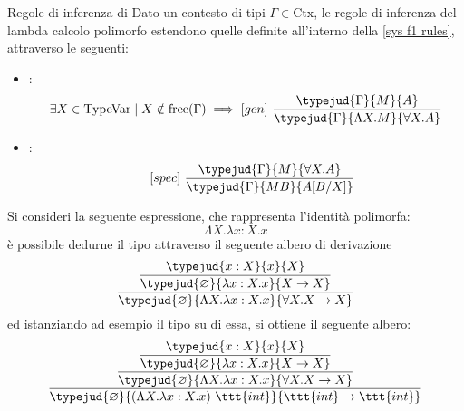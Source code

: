 \documentclass[a4paper, 12pt]{report}
\begin{document}
    \begin{framedprop}[label={regole system F}]{Regole di inferenza di }
        Dato un contesto di tipi $\Gamma \in \mathrm{Ctx}$, le regole di inferenza del lambda calcolo polimorfo estendono quelle definite all'interno della \cref{sys f1 rules}, attraverso le seguenti:

        \begin{itemize}
            \item {}: $$\exists X \in \mathrm{TypeVar} \mid X \notin \mathrm{free}(\Gamma) \implies [gen] \ \dfrac{\typejud{\Gamma}{M}{A}}{\typejud{\Gamma}{\Lambda X.M}{\forall X.A}}$$
            \item {}: $$\quad [spec] \ \dfrac{\typejud{\Gamma}{M}{\forall X.A}}{\typejud{\Gamma}{MB}{A[B/X]}}$$
        \end{itemize}
    \end{framedprop}

    \begin{example}
        Si consideri la seguente espressione, che rappresenta l'identità polimorfa: $$\Lambda X.\lambda x:X.x$$ è possibile dedurne il tipo attraverso il seguente albero di derivazione $$\dfrac{\dfrac{\typejud{x :X}{x}{X}}{\typejud{\varnothing}{\lambda x:X.x}{X \to X}}}{\typejud{\varnothing}{\Lambda X.\lambda x:X .x}{\forall X.X \to X}}$$ ed istanziando ad esempio il tipo  su di essa, si ottiene il seguente albero: $$\dfrac{\dfrac{\dfrac{\typejud{x :X}{x}{X}}{\typejud{\varnothing}{\lambda x:X.x}{X \to X}}}{\typejud{\varnothing}{\Lambda X.\lambda x:X .x}{\forall X.X \to X}}}{\typejud{\varnothing}{(\Lambda X.\lambda x :X.x) \ \ttt{int}}{\ttt{int} \to \ttt{int}}}$$
    \end{example}
\end{document}
